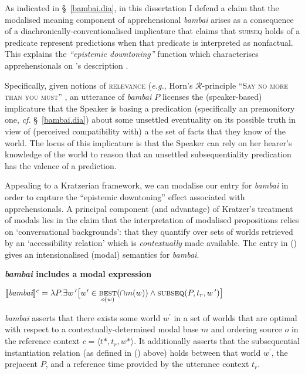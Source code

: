 \xe

As indicated in \S~\ref{bambai.dia}, in this dissertation I defend a claim that the modalised meaning component of apprehensional \textit{bambai} arises as a consequence of a dia\-chronically-conventionalised implicature that claims that \textsc{subseq} holds of a predicate represent predictions when that predicate is interpreted as nonfactual. This explains the \textit{``epistemic downtoning''} function which characterises apprehensionals on \citeauthor{Lichtenberk1995}'s description \citeyearpar{Lichtenberk1995}.

Specifically, given notions of \textsc{relevance} (\textit{e.g.}, Horn's $ \mathcal R $-principle \textsc{``Say no more than you must''} \citeyearpar[13]{Horn1984}, an utterance of \textit{bambai $P$} licenses the (speaker-based) implicature that the Speaker is basing a predication (specifically an premonitory one, \textit{cf.} §~\ref{bambai.dia}) about some unsettled eventuality on its possible truth in view of (perceived compatibility with) a the set of facts that they know of the world. The locus of this implicature is that the Speaker can rely on her hearer's knowledge of the world to reason that an unsettled subsequentiality predication has the valence of a prediction.


Appealing to a Kratzerian framework, we can modalise our entry for \textit{bambai} in order to capture the ``epistemic downtoning'' effect associated with apprehensionals. A principal component (and advantage) of Kratzer's treatment of modals \citeyearpar{Kratzer1977,Kratzer1981,Kratzer2012} lies in the claim that the interpretation of modalised propositions relies on `conversational backgrounds': that they quantify over sets of worlds retrieved by an `accessibility relation' which is \textit{contextually} made available. The entry in (\nextx) gives an intensionalised (modal) semantics for \textit{bambai}.%

\pex \textbf{\textit{bambai} includes a modal expression}

$\denote[c]{\textit{bambai}}=\lambda P.\exists w\,^\prime\big[w'\in\underset{o(w)}{\textsc{best}}(\cap m(w))\wedge\text{{\sc subseq}}(P,t_r,w\,^\prime)\big]$

\textit{bambai} asserts that there exists some world $w^\prime$ in a set of worlds that are optimal with respect to a contextually-determined modal base $m$ and ordering source $o$ in the reference context $c=\langle t*,t_r,w*\rangle$. It additionally asserts that the {\sc subsequential instantiation} relation (as defined in () above) holds between that world $w^\prime$, the prejacent $P$, and a reference time provided by the utterance context $t_r$.

